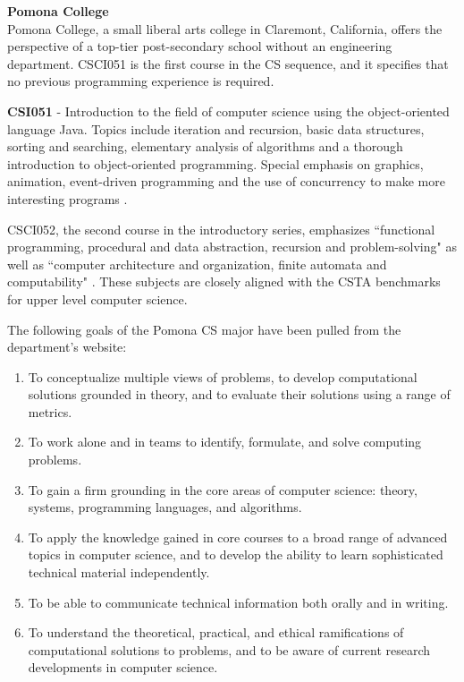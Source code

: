 \textbf{Pomona College} \\
Pomona College, a small liberal arts college in Claremont, California, offers the perspective of a top-tier post-secondary school without an engineering department. CSCI051 is the first course in the CS sequence, and it specifies that no previous programming experience is required.
\begin{blockquote}
	\textbf{CSI051} - Introduction to the field of computer science using the object-oriented language Java. Topics include iteration and recursion, basic data structures, sorting and searching, elementary analysis of algorithms and a thorough introduction to object-oriented programming. Special emphasis on graphics, animation, event-driven programming and the use of concurrency to make more interesting programs  \cite{pomonacs1}. 
\end{blockquote}
CSCI052, the second course in the introductory series, emphasizes ``functional programming, procedural and data abstraction, recursion and problem-solving" as well as ``computer architecture and organization, finite automata and computability" \cite{pomonacs1}. These subjects are closely aligned with the CSTA benchmarks for upper level computer science.  \par 
The following goals of the Pomona CS major have been pulled from the department's website: \cite{pomona}
\begin{enumerate}
	\item To conceptualize multiple views of problems, to develop computational solutions grounded in theory, and to evaluate their solutions using a range of metrics.
	\item To work alone and in teams to identify, formulate, and solve computing problems.
	\item To gain a firm grounding in the core areas of computer science: theory, systems, programming languages, and algorithms.
	\item To apply the knowledge gained in core courses to a broad range of advanced topics in computer science, and to develop the ability to learn sophisticated technical material independently.
	\item To be able to communicate technical information both orally and in writing.
	\item To understand the theoretical, practical, and ethical ramifications of computational solutions to problems, and to be aware of current research developments in computer science.
\end{enumerate}


